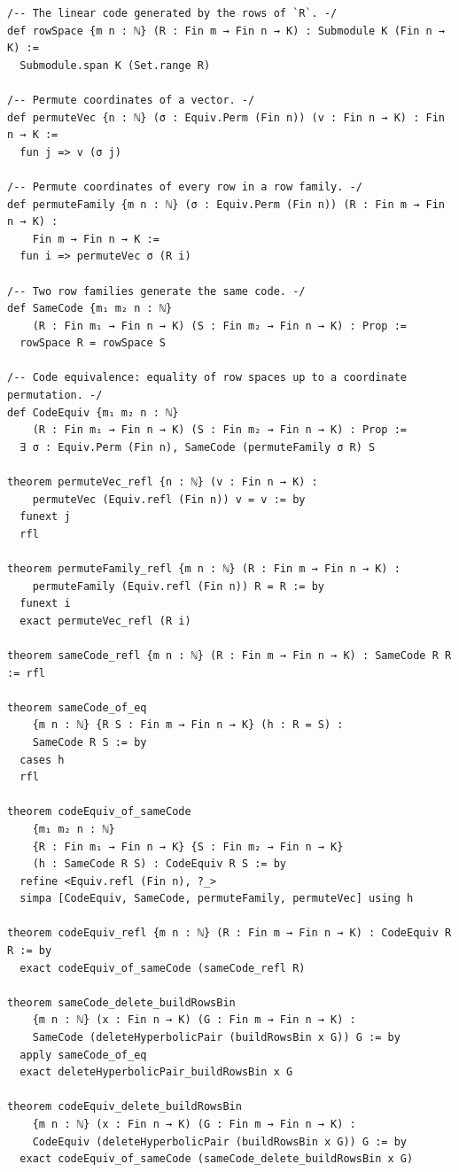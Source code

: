 \documentclass[12pt]{article}
\begin{document}
\begin{lstlisting}[caption={Lean verification for Theorem~\ref{thm:CZ_Kim_Lagrangian}.}]
/-- The linear code generated by the rows of `R`. -/
def rowSpace {m n : ℕ} (R : Fin m → Fin n → K) : Submodule K (Fin n → K) :=
  Submodule.span K (Set.range R)

/-- Permute coordinates of a vector. -/
def permuteVec {n : ℕ} (σ : Equiv.Perm (Fin n)) (v : Fin n → K) : Fin n → K :=
  fun j => v (σ j)

/-- Permute coordinates of every row in a row family. -/
def permuteFamily {m n : ℕ} (σ : Equiv.Perm (Fin n)) (R : Fin m → Fin n → K) :
    Fin m → Fin n → K :=
  fun i => permuteVec σ (R i)

/-- Two row families generate the same code. -/
def SameCode {m₁ m₂ n : ℕ}
    (R : Fin m₁ → Fin n → K) (S : Fin m₂ → Fin n → K) : Prop :=
  rowSpace R = rowSpace S

/-- Code equivalence: equality of row spaces up to a coordinate permutation. -/
def CodeEquiv {m₁ m₂ n : ℕ}
    (R : Fin m₁ → Fin n → K) (S : Fin m₂ → Fin n → K) : Prop :=
  ∃ σ : Equiv.Perm (Fin n), SameCode (permuteFamily σ R) S

theorem permuteVec_refl {n : ℕ} (v : Fin n → K) :
    permuteVec (Equiv.refl (Fin n)) v = v := by
  funext j
  rfl

theorem permuteFamily_refl {m n : ℕ} (R : Fin m → Fin n → K) :
    permuteFamily (Equiv.refl (Fin n)) R = R := by
  funext i
  exact permuteVec_refl (R i)

theorem sameCode_refl {m n : ℕ} (R : Fin m → Fin n → K) : SameCode R R := rfl

theorem sameCode_of_eq
    {m n : ℕ} {R S : Fin m → Fin n → K} (h : R = S) :
    SameCode R S := by
  cases h
  rfl

theorem codeEquiv_of_sameCode
    {m₁ m₂ n : ℕ}
    {R : Fin m₁ → Fin n → K} {S : Fin m₂ → Fin n → K}
    (h : SameCode R S) : CodeEquiv R S := by
  refine <Equiv.refl (Fin n), ?_>
  simpa [CodeEquiv, SameCode, permuteFamily, permuteVec] using h

theorem codeEquiv_refl {m n : ℕ} (R : Fin m → Fin n → K) : CodeEquiv R R := by
  exact codeEquiv_of_sameCode (sameCode_refl R)

theorem sameCode_delete_buildRowsBin
    {m n : ℕ} (x : Fin n → K) (G : Fin m → Fin n → K) :
    SameCode (deleteHyperbolicPair (buildRowsBin x G)) G := by
  apply sameCode_of_eq
  exact deleteHyperbolicPair_buildRowsBin x G

theorem codeEquiv_delete_buildRowsBin
    {m n : ℕ} (x : Fin n → K) (G : Fin m → Fin n → K) :
    CodeEquiv (deleteHyperbolicPair (buildRowsBin x G)) G := by
  exact codeEquiv_of_sameCode (sameCode_delete_buildRowsBin x G)


\end{lstlisting}
\end{document}
